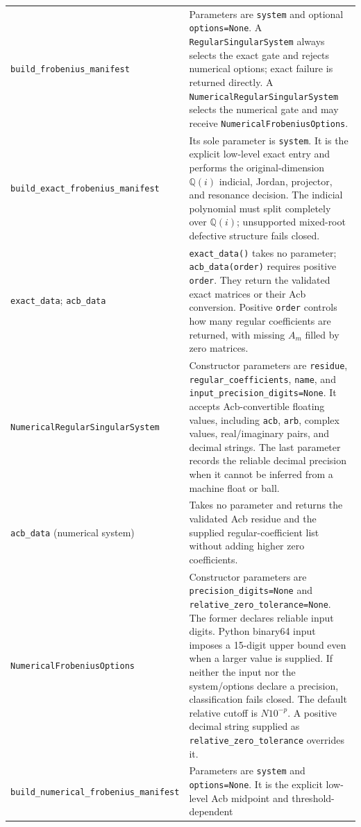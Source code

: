 \documentclass[11pt]{article}
\begin{document}
\begin{longtable}{L{0.36\textwidth}L{0.58\textwidth}}
\texttt{build\_frobenius\_manifest} & Parameters are \texttt{system} and optional
\texttt{options=None}.  A \texttt{RegularSingularSystem} always selects the exact gate and
rejects numerical options; exact failure is returned directly.  A
\texttt{NumericalRegularSingularSystem} selects the numerical gate and may receive
\texttt{NumericalFrobeniusOptions}. \\
\texttt{build\_exact\_frobenius\_manifest} & Its sole parameter is \texttt{system}.  It
is the explicit low-level exact entry and performs the original-dimension $\mathbb Q(i)$
indicial, Jordan, projector, and resonance decision.  The indicial polynomial must split
completely over $\mathbb Q(i)$;
unsupported mixed-root defective structure fails closed. \\
\texttt{exact\_data}; \texttt{acb\_data} & \texttt{exact\_data()} takes no parameter;
\texttt{acb\_data(order)} requires positive \texttt{order}.  They return the
validated exact matrices or their Acb conversion.  Positive \texttt{order} controls how
many regular coefficients are returned, with missing $A_m$ filled by zero matrices. \\
\texttt{NumericalRegularSingularSystem} & Constructor parameters are \texttt{residue},
\texttt{regular\_coefficients}, \texttt{name}, and
\texttt{input\_precision\_digits=None}.  It accepts Acb-convertible floating values,
including \texttt{acb}, \texttt{arb},
complex values, real/imaginary pairs, and decimal strings.  The last parameter records the
reliable decimal precision when it cannot be inferred from a machine float or ball. \\
\texttt{acb\_data} (numerical system) & Takes no parameter and returns the validated Acb residue and
the supplied regular-coefficient list without adding higher zero coefficients. \\
\texttt{NumericalFrobeniusOptions} & Constructor parameters are
\texttt{precision\_digits=None} and \texttt{relative\_zero\_tolerance=None}.  The former
declares reliable input digits.  Python binary64 input imposes a 15-digit upper bound even
when a larger value is supplied.  If neither the input nor the system/options declare a
precision, classification fails closed.  The default relative cutoff is
$N10^{-p}$.  A positive decimal string supplied as \texttt{relative\_zero\_tolerance}
overrides it. \\
\texttt{build\_numerical\_}\newline\texttt{frobenius\_manifest} & Parameters are
\texttt{system} and
\texttt{options=None}.  It is the explicit low-level Acb midpoint and threshold-dependent

\end{longtable}
\end{document}
